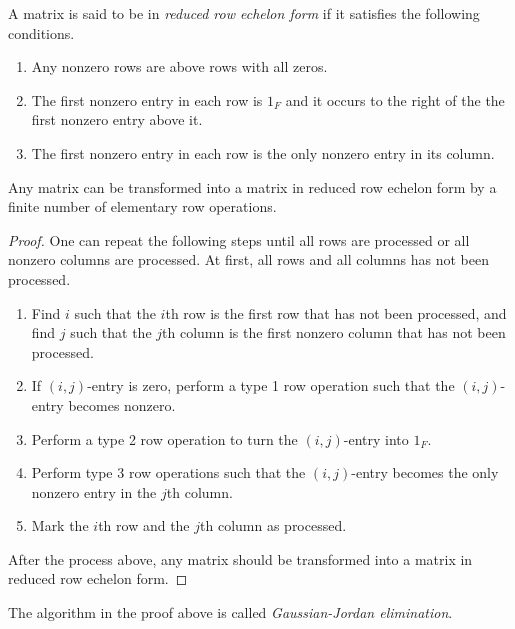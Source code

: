 \begin{definition}
  A matrix is said to be in \emph{reduced row echelon form} if it satisfies the
  following conditions.
  \begin{enumerate}
    \item Any nonzero rows are above rows with all zeros.
    \item The first nonzero entry in each row is $1_F$ and it occurs to the
    right of the the first nonzero entry above it.
    \item The first nonzero entry in each row is the only nonzero entry in its
    column.
  \end{enumerate}
\end{definition}

\begin{theorem}
  Any matrix can be transformed into a matrix in reduced row echelon form by a
  finite number of elementary row operations.
\end{theorem}
\begin{proof}
  One can repeat the following steps until all rows are processed or all
  nonzero columns are processed.
  At first, all rows and all columns has not been processed.
  \begin{enumerate}[1.]
    \item Find $i$ such that the $i$th row is the first row that has
    not been processed, and find $j$ such that the $j$th column is the first
    nonzero column that has not been processed.
    \item If $(i, j)$-entry is zero, perform a type 1 row operation such that
    the $(i, j)$-entry becomes nonzero.
    \item Perform a type 2 row operation to turn the $(i, j)$-entry into $1_F$.
    \item Perform type 3 row operations such that the $(i, j)$-entry becomes
    the only nonzero entry in the $j$th column.
    \item Mark the $i$th row and the $j$th column as processed.
  \end{enumerate}
  After the process above, any matrix should be transformed into a matrix in
  reduced row echelon form.
\end{proof}
\begin{remark}
  The algorithm in the proof above is called
  \emph{Gaussian-Jordan elimination}.
\end{remark}